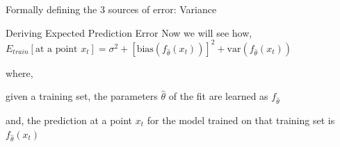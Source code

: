 \documentclass{beamer}
\begin{document}
\begin{frame}{Formally defining the 3 sources of error: Variance}

\end{frame}

\begin{frame}{Deriving Expected Prediction Error}
Now we will see how, 
$ E_{train}[\text{at a point } x_t] = \sigma^2 + [\text{bias}(f_{\hat{\theta}}(x_t))]^2 + \text{var}(f_{\hat{\theta}}(x_t)) $

where, 

given a training set, the parameters $\hat{\theta}$ of the fit are learned as $f_{\hat{\theta}}$ 

and, the prediction at a point $x_t$ for the model trained on that training set is $f_{\hat{\theta}}(x_t)$
\end{frame}
\end{document}
